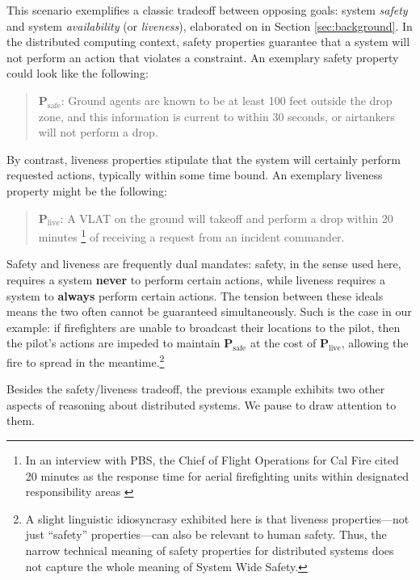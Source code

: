 \documentclass[]             %
{NASA}                       %
\theoremstyle{definition}
\begin{document}
This scenario exemplifies a classic tradeoff between opposing goals:
system \emph{safety} and system \emph{availability} (or
\emph{liveness}), elaborated on in Section \ref{sec:background}. In
the distributed computing context, safety properties guarantee that a
system will not perform an action that violates a constraint. An
exemplary safety property could look like the following:
\begin{quote}
  $\textbf{P}_\textrm{safe}$: Ground agents are known to be at least
  100 feet outside the drop zone, and this information is current to
  within 30 seconds, or airtankers will not perform a drop.
\end{quote}
By contrast, liveness properties stipulate that the system will
certainly perform requested actions, typically within some time
bound. An exemplary liveness property might be the following:
\begin{quote}
  $\textbf{P}_\textrm{live}$: A VLAT on the ground will takeoff and
  perform a drop within 20 minutes \footnote{In an interview with
  PBS, the Chief of Flight Operations for Cal Fire cited 20
  \mbox{minutes} as the response time for aerial firefighting units
  within designated responsibility areas
  \cite{2021:aerialfirefighting}} of receiving a request from an
  incident commander.
\end{quote}

Safety and liveness are frequently dual mandates: safety, in the sense
used here, requires a system \textbf{never} to perform certain
actions, while liveness requires a system to \textbf{always} perform
certain actions. The tension between these ideals means the two often
cannot be guaranteed simultaneously. Such is the case in our example:
if firefighters are unable to broadcast their locations to the pilot,
then the pilot's actions are impeded to maintain
\(\textbf{P}_\textrm{safe}\) at the cost of
\(\textbf{P}_\textrm{live}\), allowing the fire to spread in the
meantime.\footnote{A slight linguistic idiosyncrasy exhibited here is
that liveness properties---not just ``safety'' properties---can also
be relevant to human safety. Thus, the narrow technical meaning of
safety properties for distributed systems does not capture the whole
meaning of System Wide Safety.}

Besides the safety/liveness tradeoff, the previous example exhibits
two other aspects of reasoning about distributed systems. We pause to
draw attention to them.
\end{document}
